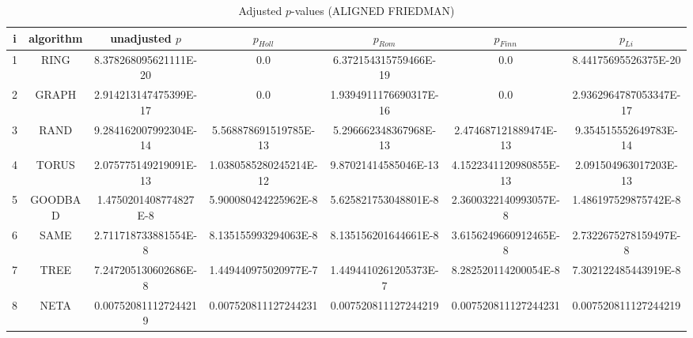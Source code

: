 \documentclass[a4paper,10pt]{article}
\begin{document}
\begin{landscape}
\begin{table}[!htp]
\centering\scriptsize
\caption{Adjusted $p$-values (ALIGNED FRIEDMAN)}
\begin{tabular}{ccccccc}
i&algorithm&unadjusted $p$&$p_{Holl}$&$p_{Rom}$&$p_{Finn}$&$p_{Li}$\\
\hline
1& RING&8.378268095621111E-20&0.0&6.372154315759466E-19&0.0&8.44175695526375E-20\\
2& GRAPH&2.914213147475399E-17&0.0&1.9394911176690317E-16&0.0&2.9362964787053347E-17\\
3& RAND&9.284162007992304E-14&5.568878691519785E-13&5.296662348367968E-13&2.474687121889474E-13&9.354515552649783E-14\\
4& TORUS&2.075775149219091E-13&1.0380585280245214E-12&9.87021414585046E-13&4.1522341120980855E-13&2.091504963017203E-13\\
5& GOODBAD&1.4750201408774827E-8&5.900080424225962E-8&5.625821753048801E-8&2.3600322140993057E-8&1.486197529875742E-8\\
6& SAME&2.711718733881554E-8&8.135155993294063E-8&8.135156201644661E-8&3.6156249660912465E-8&2.7322675278159497E-8\\
7& TREE&7.247205130602686E-8&1.449440975020977E-7&1.4494410261205373E-7&8.282520114200054E-8&7.302122485443919E-8\\
8& NETA&0.007520811127244219&0.007520811127244231&0.007520811127244219&0.007520811127244231&0.007520811127244219\\
\hline
\end{tabular}
\end{table}


\newpage


\end{landscape}
\end{document}
